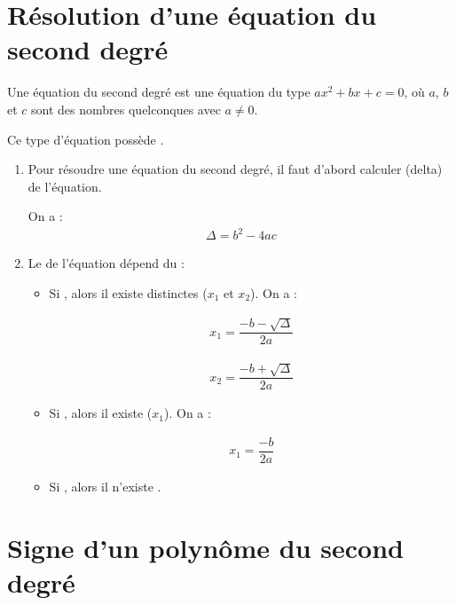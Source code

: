 \documentclass[12pt,a4paper]{article}
\date{}
\title{}
\begin{document}
{}

\section{Résolution d'une équation du second degré}

\begin{mydef}
	Une équation du second degré est une équation du type $ax^2+bx+c=0$, où $a$, $b$ et $c$ sont des nombres quelconques avec $a \neq 0$.
	
	Ce type d'équation possède .
\end{mydef}

\begin{mymeth}
	\begin{enumerate}
		\item Pour résoudre une équation du second degré, il faut d'abord calculer  (delta) de l'équation.
		
		On a : 
		\begin{align*}
			\Delta = b^2 - 4ac
		\end{align*}
		
		\item Le  de l'équation dépend du  :
		
		\begin{itemize}
		
			\item Si , alors il existe  distinctes ($x_1$ et $x_2$). On a :
			
			\begin{multicols}{2}
				\begin{align*}
					x_1=\dfrac{-b -\sqrt{\Delta}}{2a}
				\end{align*}
				
				\begin{align*}
					x_2=\dfrac{-b +\sqrt{\Delta}}{2a}
				\end{align*}
			\end{multicols}
			
			\item Si , alors il existe  ($x_1$). On a :
			
			\begin{align*}
				x_1=\dfrac{-b}{2a}
			\end{align*}
			
			\item Si , alors il n'existe . 
			
		\end{itemize} 
	\end{enumerate}
	
	
	
\end{mymeth}



\section{Signe d'un polynôme du second degré}
\end{document}
